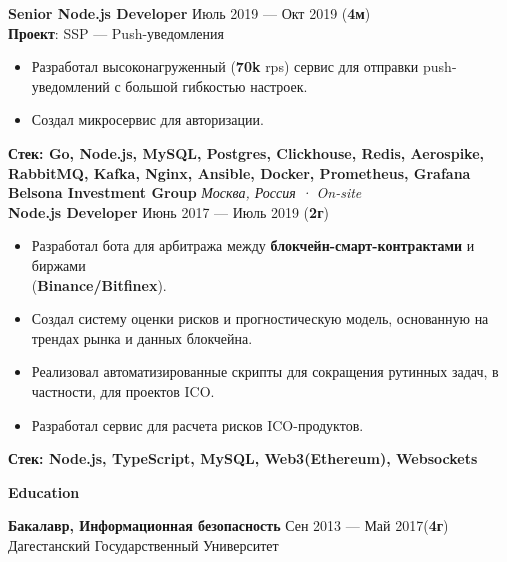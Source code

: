 \documentclass{resume}
\begin{document}
\begin{rSection}
    \textbf{Senior Node.js Developer} \hfill Июль 2019 --- Окт 2019 ({\textbf{4м}}) \\
    \textbf{Проект}: SSP --- Push-уведомления
    \begin{itemize}
        \item Разработал высоконагруженный (\textbf{70k} rps) сервис для отправки push-уведомлений с большой гибкостью настроек\@.
        \item Создал микросервис для авторизации\@.
    \end{itemize}
    \textbf{Стек: Go, Node.js, MySQL, Postgres, Clickhouse, Redis, Aerospike, RabbitMQ, Kafka, Nginx, Ansible, Docker, Prometheus, Grafana}
    \clearpage
    \textbf{Belsona Investment Group} \hfill \textit{Москва, Россия · On-site} \\
    \textbf{Node.js Developer}  \hfill Июнь 2017 --- Июль 2019 ({\textbf{2г}})
    \begin{itemize}
        \item Разработал бота для арбитража между \textbf{блокчейн-смарт-контрактами} и биржами \\
            (\textbf{Binance/Bitfinex})\@.
        \item Создал систему оценки рисков и прогностическую модель, основанную на трендах рынка и данных блокчейна\@.
        \item Реализовал автоматизированные скрипты для сокращения рутинных задач, в частности, для проектов ICO\@.
        \item Разработал сервис для расчета рисков ICO-продуктов\@.
    \end{itemize}
    \textbf{Стек: Node.js, TypeScript, MySQL, Web3(Ethereum), Websockets}

\end{rSection}


\begin{rSection}{\textbf{Education}}

    \textbf{Бакалавр, Информационная безопасность } \hfill {Сен 2013 --- Май 2017({\textbf{4г}})} \\
    Дагестанский Государственный Университет

\end{rSection}
\end{document}
